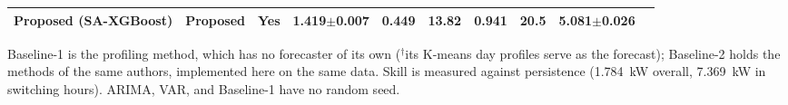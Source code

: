 \begin{table}[!t]
\begin{tabular}{llcccccccc}
\midrule
\textbf{Proposed (SA-XGBoost)} & \textbf{Proposed} & Yes & 1.419$\pm$0.007 & 0.449 & 13.82 & 0.941 & 20.5 & 5.081$\pm$0.026 \\
\bottomrule
\end{tabular}
\par\vspace{2pt}\begin{minipage}{0.97\textwidth}\footnotesize Baseline-1 is the profiling method, which has no forecaster of its own ($^\dagger$its K-means day profiles serve as the forecast); Baseline-2 holds the methods of the same authors, implemented here on the same data. Skill is measured against persistence (1.784~kW overall, 7.369~kW in switching hours). ARIMA, VAR, and Baseline-1 have no random seed.\end{minipage}
\end{table}
